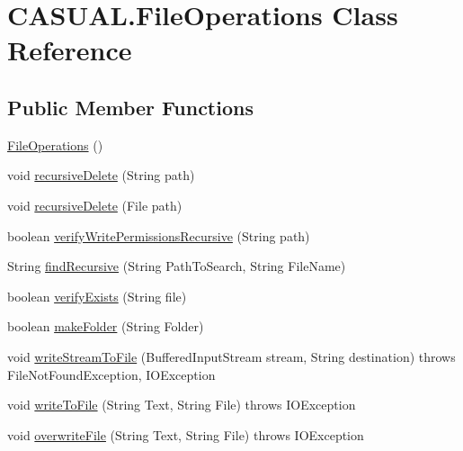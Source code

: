 \hypertarget{class_c_a_s_u_a_l_1_1_file_operations}{\section{C\-A\-S\-U\-A\-L.\-File\-Operations Class Reference}
\label{class_c_a_s_u_a_l_1_1_file_operations}
}
\subsection*{Public Member Functions}
\begin{DoxyCompactItemize}
\item 
\hyperlink{class_c_a_s_u_a_l_1_1_file_operations_aee926f79c6ce0e347940b7a6114ab195}{File\-Operations} ()
\item 
void \hyperlink{class_c_a_s_u_a_l_1_1_file_operations_a8bf6613169e83dee9b70179e1331d99d}{recursive\-Delete} (String path)
\item 
void \hyperlink{class_c_a_s_u_a_l_1_1_file_operations_a5fed83c75685ff9516eab0c37658070d}{recursive\-Delete} (File path)
\item 
boolean \hyperlink{class_c_a_s_u_a_l_1_1_file_operations_a222a88ab031762c4cc9197c3b6732baa}{verify\-Write\-Permissions\-Recursive} (String path)
\item 
String \hyperlink{class_c_a_s_u_a_l_1_1_file_operations_afe29c51ef53af5e44cc4aa61a9a103d0}{find\-Recursive} (String Path\-To\-Search, String File\-Name)
\item 
boolean \hyperlink{class_c_a_s_u_a_l_1_1_file_operations_ab8c755446ba87c4ef056cc2b156ee726}{verify\-Exists} (String file)
\item 
boolean \hyperlink{class_c_a_s_u_a_l_1_1_file_operations_a2f6eced2a42e01ee23478f3a0448b139}{make\-Folder} (String Folder)
\item 
void \hyperlink{class_c_a_s_u_a_l_1_1_file_operations_a76f17b62e1bbc87e3d557643c52e6672}{write\-Stream\-To\-File} (Buffered\-Input\-Stream stream, String destination)  throws File\-Not\-Found\-Exception, I\-O\-Exception 
\item 
void \hyperlink{class_c_a_s_u_a_l_1_1_file_operations_a71fbad8531341fe6c2c5212aac13349d}{write\-To\-File} (String Text, String File)  throws I\-O\-Exception 
\item 
void \hyperlink{class_c_a_s_u_a_l_1_1_file_operations_a6f67c5c95ce23d0d4163b56eddb8e28f}{overwrite\-File} (String Text, String File)  throws I\-O\-Exception 
\item 

\end{DoxyCompactItemize}

